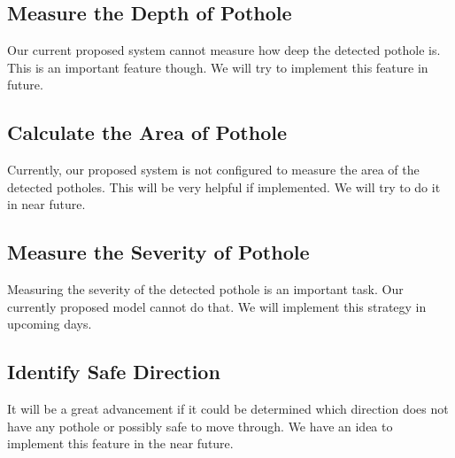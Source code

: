         \subsection{Measure the Depth of Pothole}
            Our current proposed system cannot measure how deep the detected pothole is. This is an important feature though. We will try to implement this feature in future.
            
        \subsection{Calculate the Area of Pothole}
            Currently, our proposed system is not configured to measure the area of the detected potholes. This will be very helpful if implemented.
            We will try to do it in near future.
            
        \subsection{Measure the Severity of Pothole}
            Measuring the severity of the detected pothole is an important task. Our currently proposed model cannot do that. We will implement this strategy in upcoming days. 
            
        \subsection{Identify Safe Direction}
            It will be a great advancement if it could be determined which direction does not have any pothole or possibly safe to move through.
            We have an idea to implement this feature in the near future.